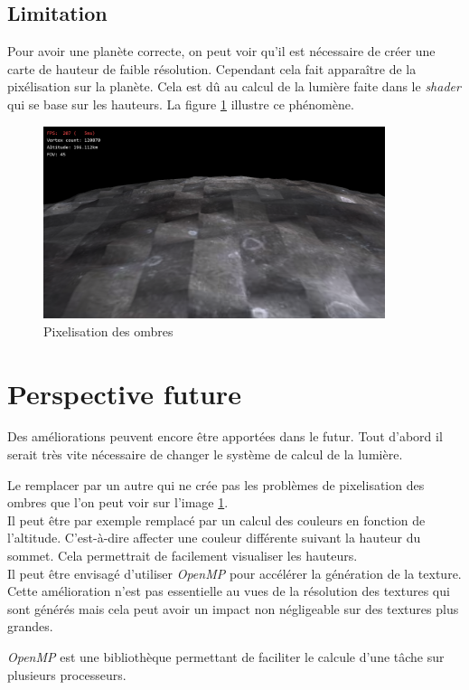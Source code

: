 \subsection{Limitation}

Pour avoir une planète correcte, on peut voir qu'il est nécessaire de créer une carte de hauteur de faible résolution. Cependant cela fait apparaître de la pixélisation sur la planète. Cela est dû au calcul de la lumière faite dans le \textit{shader} qui se base sur les hauteurs. La figure \ref{fig:px_ombre} illustre ce phénomène. \\



\begin{figure}
    \centering
    \includegraphics[width=10cm]{img/SIMPLEX_w200_h200_0.png}
    \caption{Pixelisation des ombres}
    \label{fig:px_ombre}
\end{figure}


\section{Perspective future}

Des améliorations peuvent encore être apportées dans le futur.
Tout d'abord il serait très vite nécessaire de changer le système de calcul de la lumière. 

Le remplacer par un autre qui ne crée pas les problèmes de pixelisation des ombres que l'on peut voir sur l'image \ref{fig:px_ombre}.\\

Il peut être par exemple remplacé par un calcul des couleurs en fonction de l'altitude. C'est-à-dire affecter une couleur différente suivant la hauteur du sommet. Cela permettrait de facilement visualiser les hauteurs.\\

Il peut être envisagé d'utiliser \textit{OpenMP} pour accélérer la génération de la texture. Cette amélioration n'est pas essentielle au vues de la résolution des textures qui sont générés mais cela peut avoir un impact non négligeable sur des textures plus grandes.

\textit{OpenMP} est une bibliothèque permettant de faciliter le calcule d'une tâche sur plusieurs processeurs.

